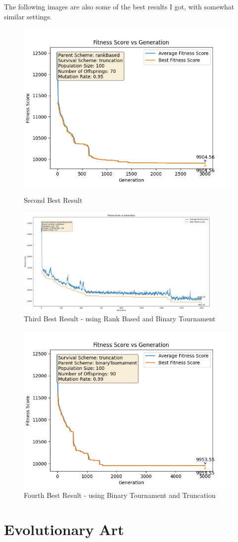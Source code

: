 \documentclass{article}
\theoremstyle{mytheoremstyle}
\theoremstyle{mytheoremstyle}
\theoremstyle{myproblemstyle}
\begin{document}
The following images are also some of the best results I got, with somewhat similar settings.

\begin{figure}[H]
    \centering
    \includegraphics[width=\textwidth]{Results/noteworthy/tsp_second_best.png}
    \caption{Second Best Result}
    \includegraphics[width=0.9\textwidth]{Results/noteworthy/tsp_third_best.jpeg}
    \caption{Third Best Result - using Rank Based and Binary Tournament}
\end{figure}

\begin{figure}[H]
    \centering
    \includegraphics[width=\textwidth]{Results/noteworthy/tsp_fourth_best.png}
    \caption{Fourth Best Result - using Binary Tournament and Truncation}
\end{figure}



\newpage
\section{Evolutionary Art}
\end{document}
